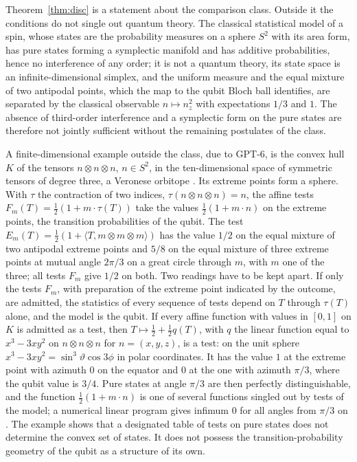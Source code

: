 Theorem~\ref{thm:disc} is a statement about the comparison class. Outside it the conditions do not single out quantum theory. The classical statistical model of a spin, whose states are the probability measures on a sphere $S^2$ with its area form, has pure states forming a symplectic manifold and has additive probabilities, hence no interference of any order; it is not a quantum theory, its state space is an infinite-dimensional simplex, and the uniform measure and the equal mixture of two antipodal points, which the map to the qubit Bloch ball identifies, are separated by the classical observable $n\mapsto n_z^2$ with expectations $1/3$ and $1$. The absence of third-order interference and a symplectic form on the pure states are therefore not jointly sufficient without the remaining postulates of the class.

A finite-dimensional example outside the class, due to GPT-6, is the convex hull $K$ of the tensors $n\otimes n\otimes n$, $n\in S^2$, in the ten-dimensional space of symmetric tensors of degree three, a Veronese orbitope \cite{orbitopes}. Its extreme points form a sphere. With $\tau$ the contraction of two indices, $\tau(n\otimes n\otimes n)=n$, the affine tests $F_m(T)=\tfrac12(1+m\cdot\tau(T))$ take the values $\tfrac12(1+m\cdot n)$ on the extreme points, the transition probabilities of the qubit. The test $E_m(T)=\tfrac12(1+\langle T,m\otimes m\otimes m\rangle)$ has the value $1/2$ on the equal mixture of two antipodal extreme points and $5/8$ on the equal mixture of three extreme points at mutual angle $2\pi/3$ on a great circle through $m$, with $m$ one of the three; all tests $F_m$ give $1/2$ on both. Two readings have to be kept apart. If only the tests $F_m$, with preparation of the extreme point indicated by the outcome, are admitted, the statistics of every sequence of tests depend on $T$ through $\tau(T)$ alone, and the model is the qubit. If every affine function with values in $[0,1]$ on $K$ is admitted as a test, then $T\mapsto\tfrac12+\tfrac12q(T)$, with $q$ the linear function equal to $x^3-3xy^2$ on $n\otimes n\otimes n$ for $n=(x,y,z)$, is a test: on the unit sphere $x^3-3xy^2=\sin^3\vartheta\cos3\phi$ in polar coordinates. It has the value $1$ at the extreme point with azimuth $0$ on the equator and $0$ at the one with azimuth $\pi/3$, where the qubit value is $3/4$. Pure states at angle $\pi/3$ are then perfectly distinguishable, and the function $\tfrac12(1+m\cdot n)$ is one of several functions singled out by tests of the model; a numerical linear program gives infimum $0$ for all angles from $\pi/3$ on \cite{comp3}. The example shows that a designated table of tests on pure states does not determine the convex set of states. It does not possess the transition-probability geometry of the qubit as a structure of its own.

